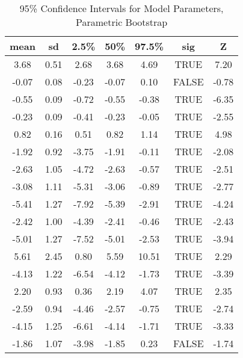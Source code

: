 \begin{table}[hbp!]
\centering
\begin{tabular}{|c|c|c|c|c|c|c|}
  \hline
  \textbf{mean} & \textbf{sd} & \textbf{2.5\%} & \textbf{50\%} & \textbf{97.5\%} & \textbf{sig} & \textbf{Z} \\ 
  \hline
3.68 & 0.51 & 2.68 & 3.68 & 4.69 & TRUE & 7.20 \\ 
  -0.07 & 0.08 & -0.23 & -0.07 & 0.10 & FALSE & -0.78 \\ 
  -0.55 & 0.09 & -0.72 & -0.55 & -0.38 & TRUE & -6.35 \\ 
  -0.23 & 0.09 & -0.41 & -0.23 & -0.05 & TRUE & -2.55 \\ 
  0.82 & 0.16 & 0.51 & 0.82 & 1.14 & TRUE & 4.98 \\ 
  -1.92 & 0.92 & -3.75 & -1.91 & -0.11 & TRUE & -2.08 \\ 
  -2.63 & 1.05 & -4.72 & -2.63 & -0.57 & TRUE & -2.51 \\ 
  -3.08 & 1.11 & -5.31 & -3.06 & -0.89 & TRUE & -2.77 \\ 
  -5.41 & 1.27 & -7.92 & -5.39 & -2.91 & TRUE & -4.24 \\ 
  -2.42 & 1.00 & -4.39 & -2.41 & -0.46 & TRUE & -2.43 \\ 
  -5.01 & 1.27 & -7.52 & -5.01 & -2.53 & TRUE & -3.94 \\ 
  5.61 & 2.45 & 0.80 & 5.59 & 10.51 & TRUE & 2.29 \\ 
  -4.13 & 1.22 & -6.54 & -4.12 & -1.73 & TRUE & -3.39 \\ 
  2.20 & 0.93 & 0.36 & 2.19 & 4.07 & TRUE & 2.35 \\ 
  -2.59 & 0.94 & -4.46 & -2.57 & -0.75 & TRUE & -2.74 \\ 
  -4.15 & 1.25 & -6.61 & -4.14 & -1.71 & TRUE & -3.33 \\ 
  -1.86 & 1.07 & -3.98 & -1.85 & 0.23 & FALSE & -1.74 \\ 
   \hline
\end{tabular}
\caption{95\% Confidence Intervals for Model Parameters, Parametric Bootstrap}
\end{table}
